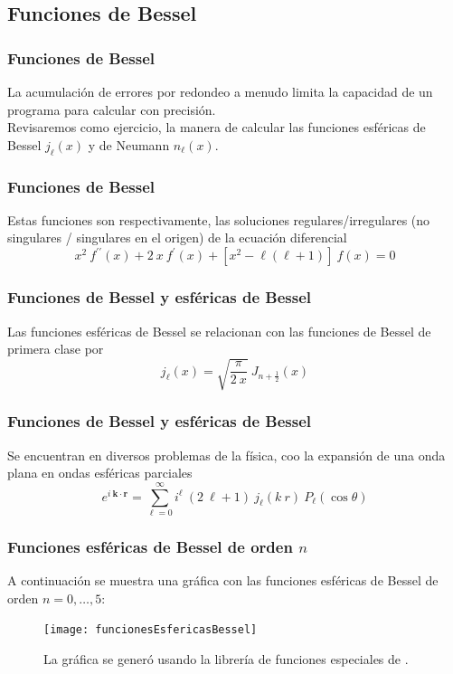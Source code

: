 \subsection{Funciones de Bessel}
\begin{frame}
\frametitle{Funciones de Bessel}
La acumulación de errores por redondeo a menudo limita la capacidad de un programa para calcular con precisión.
\\
\bigskip
\pause
Revisaremos como ejercicio, la manera de calcular las funciones esféricas de Bessel $j_{\ell}(x)$ y de Neumann $n_{\ell}(x)$.
\end{frame}
\begin{frame}
\frametitle{Funciones de Bessel}
Estas funciones son respectivamente, las soluciones regulares/irregulares (no singulares / singulares en el origen) de la ecuación diferencial
\begin{equation}
x^{2} \: f^{\prime \prime} (x) + 2 \: x \: f^{\prime}(x) + [ x^{2} - \ell ( \ell + 1)] \: f(x) = 0
\label{eq:ecuacion_02_19}
\end{equation}
\end{frame}
\begin{frame}
\frametitle{Funciones de Bessel y esféricas de Bessel}
Las funciones esféricas de Bessel se relacionan con las funciones de Bessel de primera clase por
\[ j_{\ell}(x) = \sqrt{\dfrac{\pi}{2 \: x}} \: J_{n + \frac{1}{2}} (x) \]
\end{frame}
\begin{frame}
\frametitle{Funciones de Bessel y esféricas de Bessel}
Se encuentran en diversos problemas de la física, coo la expansión de una onda plana en ondas esféricas parciales
\begin{equation}
e^{i \: \mathbf{k \cdot r}} = \sum_{\ell = 0}^{\infty} i^{\ell} \: (2 \: \ell + 1) \: j_{\ell} (k \:  r) \: P_{\ell}(\cos \theta)
\label{eq:ecuacion_02_20}
\end{equation}    
\end{frame}
\begin{frame}
\frametitle{Funciones esféricas de Bessel de orden $n$}
\fontsize{12}{12}\selectfont
A continuación se muestra una gráfica con las funciones esféricas de Bessel de orden $n = 0, \ldots, 5$:
\begin{figure}
\centering
\texttt{[image: funcionesEsfericasBessel]}
\caption{La gráfica se generó usando la librería de funciones especiales de \python.}
\end{figure}
\end{frame}
